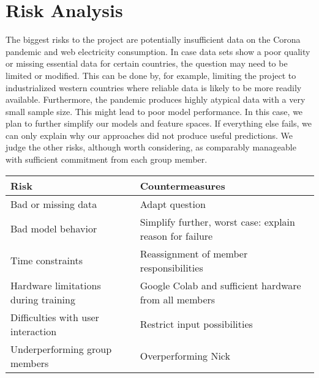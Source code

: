 \documentclass[s=english,inputenc=utf8,fontsize=10pt]{ldvarticle}
\begin{document}
\newpage

\section{Risk Analysis}

The biggest risks to the project are potentially insufficient data on the Corona pandemic and web electricity consumption. In case data sets show a poor quality or missing essential data for certain countries, the question may need to be limited or modified. This can be done by, for example, limiting the project to industrialized western countries where reliable data is likely to be more readily available. Furthermore, the pandemic produces highly atypical data with a very small sample size. This might lead to poor model performance. In this case, we plan to further simplify our models and feature spaces. If everything else fails, we can only explain why our approaches did not produce useful predictions. We judge the other risks, although worth considering, as comparably manageable with sufficient commitment from each group member.
\begin{center}
	\begin{footnotesize}
		\setlength{\arrayrulewidth}{1,05pt}
		\begin{tabular}[htb]{|p{5cm}|p{7.1cm}|}
			\hline
			\textbf{Risk} & \textbf{Countermeasures} \\
			\hline
			\hline
			\rowcolor{lightgray} Bad or missing data & Adapt question \\
			\hline
			\rowcolor{lightgray} Bad model behavior & Simplify further, worst case: explain reason for failure \\
			\hline	
			\rowcolor{lightgray} Time constraints & Reassignment of member responsibilities \\
			\hline
			\rowcolor{lightgray} Hardware limitations during training & Google Colab and sufficient hardware from all members\\
			\hline
			\rowcolor{lightgray} Difficulties with user interaction & Restrict input possibilities \\
			\hline
			\rowcolor{lightgray} Underperforming group members & Overperforming Nick \\
			\hline	
		\end{tabular}
	\end{footnotesize}
\end{center}
\end{document}
